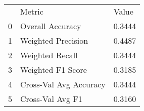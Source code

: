 \begin{tabular}{lll}
 & Metric & Value \\
0 & Overall Accuracy & 0.3444 \\
1 & Weighted Precision & 0.4487 \\
2 & Weighted Recall & 0.3444 \\
3 & Weighted F1 Score & 0.3185 \\
4 & Cross-Val Avg Accuracy & 0.3444 \\
5 & Cross-Val Avg F1 & 0.3160 \\
\end{tabular}
